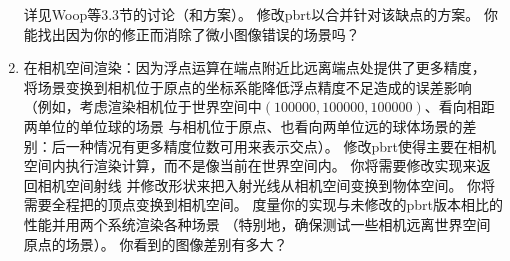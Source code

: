 \begin{enumerate}
          详见Woop等\parencite*{Woop2013Watertight}3.3节的讨论（和方案）。
          修改pbrt以合并针对该缺点的方案。
          你能找出因为你的修正而消除了微小图像错误的场景吗？
    \item \circlethree 在相机空间渲染：因为浮点运算在端点附近比远离端点处提供了更多精度，
          将场景变换到相机位于原点的坐标系能降低浮点精度不足造成的误差影响
          （例如，考虑渲染相机位于世界空间中$(100000,100000,100000)$、看向相距两单位的单位球的场景
          与相机位于原点、也看向两单位远的球体场景的差别：后一种情况有更多精度位数可用来表示交点）。
          修改pbrt使得主要在相机空间内执行渲染计算，而不是像当前在世界空间内。
          你将需要修改实现来返回相机空间射线
          并修改形状来把入射光线从相机空间变换到物体空间。
          你将需要全程把的顶点变换到相机空间。
          度量你的实现与未修改的pbrt版本相比的性能并用两个系统渲染各种场景
          （特别地，确保测试一些相机远离世界空间原点的场景）。
          你看到的图像差别有多大？
\end{enumerate}